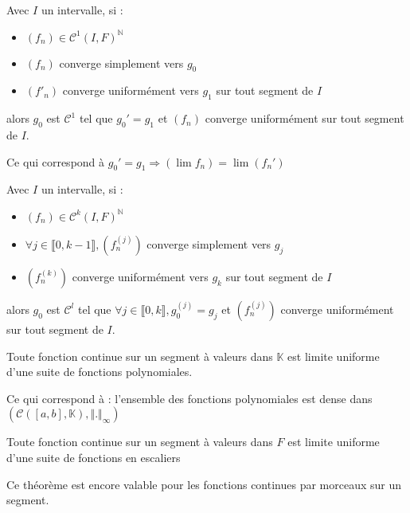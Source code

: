 \documentclass[a4paper,12pt]{book}
\newcommand{\Thr}[2]{\begin{tcolorbox}[sharp corners, colback=white,colframe=red!10!blue!30!green!75!, title=Théorème : #1]#2\end{tcolorbox}}
\def\N{\mathbb{N}}
\def\K{\mathbb{K}}
\begin{document}
\Thr{Dérivation uniforme des suites de fonctions}{Avec $I$ un intervalle, si :\begin{itemize}\item $(f_n)\in\mathcal{C}^1(I,F)^\N$ \item $(f_n)$ converge simplement vers $g_0$ \item $(f'_n)$ converge uniformément vers $g_1$ sur tout segment de $I$\end{itemize} alors $g_0$ est $\mathcal{C}^1$ tel que $g_0'=g_1$ et $(f_n)$ converge uniformément sur tout segment de $I$.
\par Ce qui correspond à $g_0'=g_1 \Rightarrow (\lim f_n)=\lim (f_n')$}
\Thr{Théorème de dérivation des suites à l'ordre k}{Avec $I$ un intervalle, si :\begin{itemize}\item $(f_n)\in\mathcal{C}^k(I,F)^\N$ \item $\forall j\in\llbracket0,k-1\rrbracket, (f_n^{(j)})$ converge simplement vers $g_j$ \item $(f_n^{(k)})$ converge uniformément vers $g_k$ sur tout segment de $I$\end{itemize} alors $g_0$ est $\mathcal{C}^l$ tel que $\forall j\in\llbracket0,k\rrbracket, g_0^{(j)}=g_j$ et $(f_n^{(j)})$ converge uniformément sur tout segment de $I$.}
\Thr{Stone-Weierstrass (admis)}{Toute fonction continue sur un segment à valeurs dans $\K$ est limite uniforme d'une suite de fonctions polynomiales.
\par Ce qui correspond à : l'ensemble des fonctions polynomiales est dense dans $(\mathcal{C}([a,b],\K),\Vert.\Vert_\infty)$}
\Thr{Approximmation uniforme par des fonctions en escalier}{Toute fonction continue sur un segment à valeurs dans $F$ est limite uniforme d'une suite de fonctions en escaliers
\par Ce théorème est encore valable pour les fonctions continues par morceaux sur un segment.}
\end{document}
